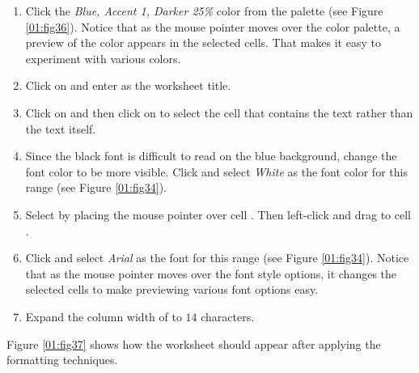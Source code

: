 \begin{enumbox}
\begin{enumerate}
		\item Click the \textit{Blue, Accent 1, Darker 25\%} color from the palette (see Figure \ref{01:fig36}). Notice that as the mouse pointer moves over the color palette, a preview of the color appears in the selected cells. That makes it easy to experiment with various colors.
		\item Click on  and enter  as the worksheet title.
		\item Click on  and then click on  to select the cell that contains the text rather than the text itself.
		\item Since the black font is difficult to read on the blue background, change the font color to be more visible. Click  and select \textit{White} as the font color for this range (see Figure \ref{01:fig34}).
		\item Select  by placing the mouse pointer over cell . Then left-click and drag to cell .
		\item Click  and select \textit{Arial} as the font for this range (see Figure \ref{01:fig34}). Notice that as the mouse pointer moves over the font style options, it changes the selected cells to make previewing various font options easy.
		\item Expand the column width of  to $ 14 $ characters.
	\end{enumerate}
\end{enumbox}

Figure \ref{01:fig37} shows how the  worksheet should appear after applying the formatting techniques.

